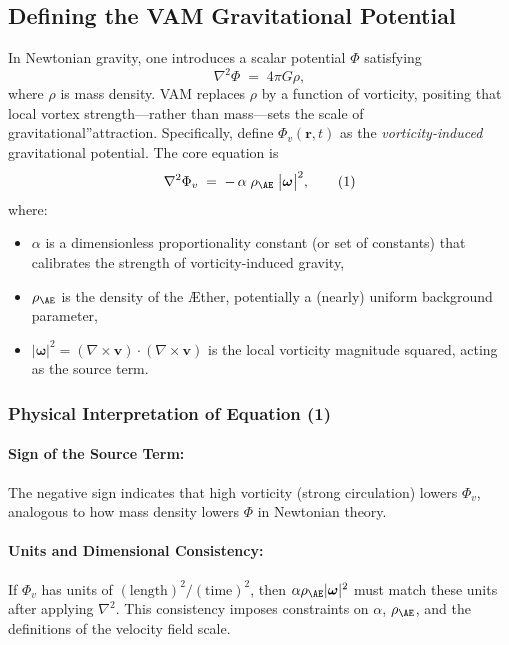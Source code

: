 \subsection{Defining the VAM Gravitational Potential}
In Newtonian gravity, one introduces a scalar potential \(\Phi\) satisfying
\[
    \nabla^2 \Phi \;=\; 4 \pi G \rho,
\]
where \(\rho\) is mass density. VAM replaces \(\rho\) by a function of vorticity, positing that local vortex strength—rather than mass—sets the scale of \grqq gravitational\textquotedblright attraction. Specifically, define \(\Phi_v(\mathbf{r},t)\) as the \textit{vorticity-induced} gravitational potential. The core equation is
\[
    \nabla^2 \Phi_v \;=\; -\,\alpha \;\rho_{\mathrm{\AE}}\;\bigl|\boldsymbol{\omega}\bigr|^2,
    \tag{1}
\]
where:
\begin{itemize}
    \item \(\alpha\) is a dimensionless proportionality constant (or set of constants) that calibrates the strength of vorticity-induced gravity,
    \item \(\rho_{\mathrm{\AE}}\) is the density of the Æther, potentially a (nearly) uniform background parameter,
    \item \(\lvert \boldsymbol{\omega} \rvert^2 = (\nabla \times \mathbf{v})\cdot(\nabla \times \mathbf{v})\) is the local vorticity magnitude squared, acting as the source term.
\end{itemize}

\subsubsection{Physical Interpretation of Equation (1)}

\paragraph{Sign of the Source Term:} The negative sign indicates that high vorticity (strong circulation) lowers \(\Phi_v\), analogous to how mass density lowers \(\Phi\) in Newtonian theory.

\paragraph{Units and Dimensional Consistency:} If \(\Phi_v\) has units of \((\text{length})^2/(\text{time})^2\), then \(\alpha \rho_{\mathrm{\AE}} \lvert \boldsymbol{\omega} \rvert^2\) must match these units after applying \(\nabla^2\). This consistency imposes constraints on \(\alpha\), \(\rho_{\mathrm{\AE}}\), and the definitions of the velocity field scale.


